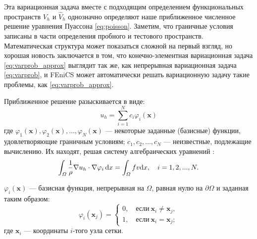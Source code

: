 Эта вариационная задача вместе с подходящим определением функциональных пространств ${V_h}$ и ${\hat V_h}$ однозначно определяют наше приближенное численное решение уравнения Пуассона \eqref{eq:poisson}. Заметим, что граничные условия записаны в части определения пробного и тестового пространств. Математическая структура может показаться сложной на первый взгляд, но хорошая новость заключается в том, что конечно-элементная вариационная задача \eqref{eq:varprob_approx} выглядит так же, как непрерывная вариационная задача \eqref{eq:varprob}, и FEniCS может автоматически решать вариационную задачу такие проблемы, как \eqref{eq:varprob_approx}.

Приближенное решение разыскивается в виде:
\begin{equation}
u_h = \sum_{i=1}^N c_i \varphi_i(\bm x)
\end{equation}
где ${\varphi_1(\bm x), \varphi_2(\bm x), ..., \varphi_N(\bm x)}$
--- некоторые заданные (базисные) функции,
удовлетворяющие граничным условиям;
${c_1, c_2, ..., c_N}$ --- неизвестные, подлежащие вычислению.
Их находят, решая систему алгебраических уравнений \cite[с. 14]{FEM_intro}:
\begin{equation}
\int_\varOmega \frac 1 \rho \nabla u_h \cdot \nabla \varphi_i \, \mathrm{d}x = \int_{\varOmega} f v \mathrm{d} x, \quad i = 1, 2, ..., N.
\end{equation}

${\varphi_i(\bm x)}$ --- базисная функция, непрерывная на ${\Omega}$,
равная нулю на ${\partial \Omega}$ и заданная таким образом:
\begin{equation}
\varphi_i(\bm x_j) =
\left\{ \begin{aligned}
    0, \quad \text{если} \ \bm x_i \neq \bm x_j, \\
    1, \quad \text{если} \ \bm x_i = \bm x_j;
\end{aligned} \right.
\end{equation}
где ${\bm x_i}$ --- координаты ${i}$-того узла сетки.

\clearpage